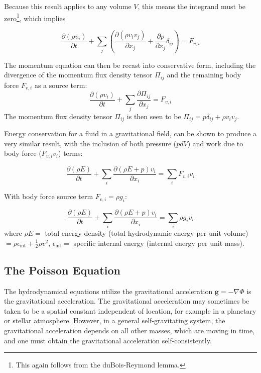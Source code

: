 \documentclass[notoc]{tufte-handout}
\renewcommand{\vec}[1]{
\mathbf{#1}
}
\begin{document}
Because this result applies to any volume $V$, this means the integrand must be zero\footnote{This again follows from the duBois-Reymond lemma.}, which implies

\begin{equation}
\frac{\partial(\rho {v}_i)}{\partial t} + \sum_j \left (  \frac{\partial(\rho {v}_i {v}_j)}{\partial x_j} + \frac{\partial p}{\partial x_j} \delta_{ij} \right) = F_{v,i} 
\end{equation}

The momentum equation can then be recast into conservative form, including the divergence of the momentum flux density tensor $\Pi_{ij}$ and the remaining body force $F_{v,i}$ as a source term:
\begin{equation}
\boxed {\frac{\partial(\rho {v}_i)}{\partial t} + \sum_j \frac{\partial \Pi_{ij}} {\partial x_j} = F_{v,i} }
\label{eqn:momentum_equation}
\end{equation}
%
The momentum flux density tensor $\Pi_{ij}$ is then seen to be $\Pi_{ij} = p \delta_{ij} + \rho v_i v_j$.

Energy conservation for a fluid in a gravitational field,  can be shown to produce a very similar result, with the inclusion of both pressure ($p dV$) and  work due to body force ($ F_{v,i}  v_i $) terms: 

\begin{equation}
\boxed {\frac{\partial (\rho E)}{\partial t} + \sum_i  \frac{\partial (\rho E + p)v_i}{\partial x_i} = \sum_i F_{v,i}  v_i }
\label {eqn:energy_equation}
\end{equation}

With body force source term $F_{v,i} = \rho g_i$:

\begin{equation}
{\frac{\partial (\rho E)}{\partial t} + \sum_i  \frac{\partial (\rho E + p)v_i}{\partial x_i} = \sum_i  \rho g_i v_i }
\end{equation}
where $\rho E=$ total energy density (total hydrodynamic energy per unit volume) $=\rho \epsilon_{\text{int}} + \frac{1}{2}\rho v^2$, $\epsilon_{\text{int}}=$ specific internal energy (internal energy per unit mass).

\subsection{The Poisson Equation}

The hydrodynamical equations utilize the gravitational acceleration $\vec {g}= -\nabla \Phi$ is the gravitational acceleration. The gravitational acceleration may sometimes be taken to be a spatial constant independent of location, for example in a planetary or stellar atmosphere. However, in a general self-gravitating system, the gravitational acceleration depends on all other masses, which are moving in time, and one must obtain the gravitational acceleration self-consistently. 
\end{document}
